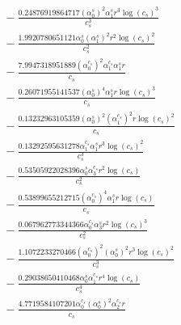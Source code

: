 \documentclass[10pt]{article}
\begin{document}
\begin{align*}
&{}  - \frac{0.24876919864717 \left(\alpha_{0}^s\right)^{2} \alpha_{1}^s r^{3} \log{\left(c_{s} \right)}^{3}}{c_{s}^{3}} \\
&{}  - \frac{1.9920780651121 \alpha_{0}^s \left(\alpha_{1}^s\right)^{2} r^{2} \log{\left(c_{s} \right)}^{2}}{c_{s}^{2}} \\
&{}  - \frac{7.9947318951889 \left(\alpha_{0}^{c_s}\right)^{2} \alpha_{1}^{c_s} \alpha_{1}^s r}{c_{s}} \\
&{}  - \frac{0.26071955141537 \left(\alpha_{0}^s\right)^{4} \alpha_{1}^s r \log{\left(c_{s} \right)}^{3}}{c_{s}} \\
&{}  - \frac{0.13232963105359 \left(\alpha_{0}^s\right)^{2} \left(\alpha_{1}^{c_s}\right)^{2} r \log{\left(c_{s} \right)}^{2}}{c_{s}} \\
&{}  - \frac{0.13292595631278 \alpha_{1}^{c_s} \alpha_{1}^s r^{3} \log{\left(c_{s} \right)}^{2}}{c_{s}^{3}} \\
&{}  - \frac{0.53505922028396 \alpha_{0}^s \alpha_{3}^{c_s} r^{2} \log{\left(c_{s} \right)}}{c_{s}^{2}} \\
&{}  - \frac{0.53899655212715 \left(\alpha_{0}^{c_s}\right)^{4} \alpha_{1}^s r \log{\left(c_{s} \right)}}{c_{s}} \\
&{}  - \frac{0.067962773344366 \alpha_{0}^{c_s} \alpha_{3}^s r^{2} \log{\left(c_{s} \right)}^{3}}{c_{s}^{2}} \\
&{}  - \frac{1.1072233270466 \left(\alpha_{0}^{c_s}\right)^{2} \left(\alpha_{0}^s\right)^{2} r^{3} \log{\left(c_{s} \right)}^{2}}{c_{s}^{3}} \\
&{}  - \frac{0.29038650410468 \alpha_{0}^s \alpha_{1}^{c_s} r^{4} \log{\left(c_{s} \right)}}{c_{s}^{4}} \\
&{}  - \frac{4.7719584107201 \alpha_{0}^{c_s} \left(\alpha_{0}^s\right)^{2} \alpha_{2}^{c_s} r}{c_{s}}
\end{align*}
\end{document}
